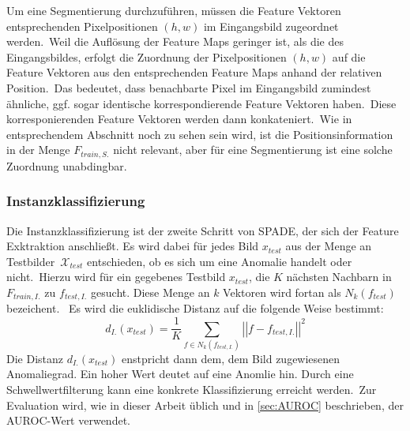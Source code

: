 Um eine Segmentierung durchzuführen, müssen die Feature Vektoren entsprechenden Pixelpositionen $(h,w)$ im Eingangsbild zugeordnet werden.\
Weil die Auflösung der Feature Maps geringer ist, als die des Eingangsbildes, erfolgt die Zuordnung der Pixelpositionen $(h,w)$ auf die Feature Vektoren aus den entsprechenden Feature Maps anhand der relativen Position.\
Das bedeutet, dass benachbarte Pixel im Eingangsbild zumindest ähnliche, ggf. sogar identische korrespondierende Feature Vektoren haben.\
Diese korresponierenden Feature Vektoren werden dann konkateniert.\
Wie in entsprechendem Abschnitt noch zu sehen sein wird, ist die Positionsinformation in der Menge $F_{train, S.}$ nicht relevant, aber für eine Segmentierung ist eine solche Zuordnung unabdingbar.\
\subsubsection{Instanzklassifizierung}
Die Instanzklassifizierung ist der zweite Schritt von SPADE, der sich der Feature Exktraktion anschließt. Es wird dabei für jedes Bild $x_{test}$ aus der Menge an Testbilder\
$\mathcal{X}_{test}$ entschieden, ob es sich um eine Anomalie handelt oder nicht.\
Hierzu wird für ein gegebenes Testbild $x_{test}$, die $K$ nächsten Nachbarn in $F_{train, I.}$ zu $f_{test, I.}$ gesucht. Diese Menge an $k$ Vektoren wird fortan als $N_{k}(f_{test})$ bezeichent. \
Es wird die euklidische Distanz auf die folgende Weise bestimmt:
$$
d_{I.}(x_{test}) = \frac{1}{K} \sum_{f\in N_{k}(f_{test, I.})} \left|\left| f - f_{test, I.} \right|\right|^{2}
$$
Die Distanz $d_{I.}(x_{test})$ enstpricht dann dem, dem Bild zugewiesenen Anomaliegrad. Ein hoher Wert deutet auf eine Anomlie hin. Durch eine Schwellwertfilterung kann eine konkrete Klassifizierung erreicht werden.\
Zur Evaluation wird, wie in dieser Arbeit üblich und in \ref{sec:AUROC} beschrieben, der AUROC-Wert verwendet.\
